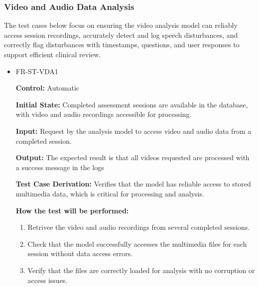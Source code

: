 \documentclass[12pt, titlepage]{article}
\begin{document}
\subsubsection{Video and Audio Data Analysis}

\hspace{2em}The test cases below focus on ensuring the video analysis model can reliably access 
session recordings, accurately detect and log speech disturbances, and correctly flag 
disturbances with timestamps, questions, and user responses to support efficient clinical review.
\begin{itemize}
  \item FR-ST-VDA1
  \begin{mdframed}[linewidth=0.5mm]
      \textbf{Control:} Automatic \par
      \textbf{Initial State:} Completed assessment sessions are available in the database, with video and audio recordings accessible for processing. \par
      \textbf{Input:} Request by the analysis model to access video and audio data from a completed session. \par
      \textbf{Output:} The expected result is that all videos requested are processed with a success message in the logs \par
      \textbf{Test Case Derivation:} Verifies that the model has reliable access to stored multimedia data, which is critical for processing and analysis. \par
      \textbf{How the test will be performed:}
      \begin{enumerate}[noitemsep]
        \item Retrivee the video and audio recordings from several completed sessions.
        \item Check that the model successfully accesses the multimedia files for each session without data access errors.
        \item Verify that the files are correctly loaded for analysis with no corruption or access issues.
      \end{enumerate}
  \end{mdframed}


\end{itemize}
\end{document}
